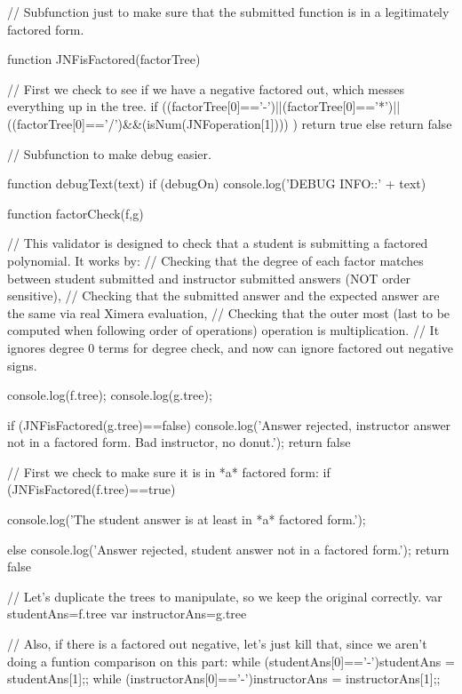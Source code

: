 \documentclass{ximera}
\begin{document}
\begin{javascript}
// Subfunction just to make sure that the submitted function is in a legitimately factored form.

function JNFisFactored(factorTree) {
   
    // First we check to see if we have a negative factored out, which messes everything up in the tree.
    if ((factorTree[0]=='-')||(factorTree[0]=='*')||((factorTree[0]=='/')&&(isNum(JNFoperation[1])))
    ) {return true} else {return false}
}

// Subfunction to make debug easier.

function debugText(text) {
    if (debugOn) {
    console.log('DEBUG INFO::' + text)
    }
}



function factorCheck(f,g) {
    // This validator is designed to check that a student is submitting a factored polynomial. It works by:
    //  Checking that the degree of each factor matches between student submitted and instructor submitted answers (NOT order sensitive),
    //  Checking that the submitted answer and the expected answer are the same via real Ximera evaluation,
    //  Checking that the outer most (last to be computed when following order of operations) operation is multiplication.
    //  It ignores degree 0 terms for degree check, and now can ignore factored out negative signs.
    
    
    console.log(f.tree);
    console.log(g.tree);

    if (JNFisFactored(g.tree)==false) {
        console.log('Answer rejected, instructor answer not in a factored form. Bad instructor, no donut.');
        return false
    }
    
    // First we check to make sure it is in *a* factored form:
    if (JNFisFactored(f.tree)==true) {
        console.log('The student answer is at least in *a* factored form.');
        
        
    } else {
        console.log('Answer rejected, student answer not in a factored form.');
        return false
    }
    
    // Let's duplicate the trees to manipulate, so we keep the original correctly.
    var studentAns=f.tree
    var instructorAns=g.tree
    
    // Also, if there is a factored out negative, let's just kill that, since we aren't doing a funtion comparison on this part:
    while (studentAns[0]=='-'){studentAns = studentAns[1];};
    while (instructorAns[0]=='-'){instructorAns = instructorAns[1];};
    
}
\end{javascript}
\end{document}
